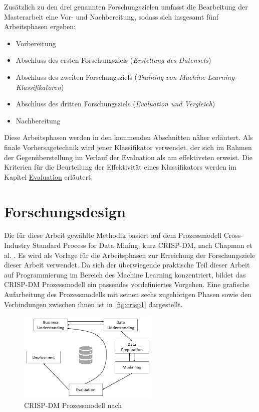 \label{phases_definition}

Zusätzlich zu den drei genannten Forschungszielen umfasst die Bearbeitung der Masterarbeit eine Vor- und Nachbereitung, sodass sich insgesamt fünf Arbeitsphasen ergeben:

\begin{itemize}
\setlength{\itemsep}{-2pt}
\item Vorbereitung
\item Abschluss des ersten Forschungsziels (\textit{Erstellung des Datensets})
\item Abschluss des zweiten Forschungsziels (\textit{Training von Machine-Learning-Klassifikatoren})
\item Abschluss des dritten Forschungsziels (\textit{Evaluation und Vergleich})
\item Nachbereitung
\end{itemize}

Diese Arbeitsphasen werden in den kommenden Abschnitten näher erläutert. Als finale Vorhersagetechnik wird jener Klassifikator verwendet, der sich im Rahmen der Gegenüberstellung im Verlauf der Evaluation als am \glqq effektivsten\grqq{} erweist. Die Kriterien für die Beurteilung der Effektivität eines Klassifikators werden im Kapitel \glqq \hyperref[evaluation]{Evaluation}\grqq{} erläutert.

\section{Forschungsdesign}

Die für diese Arbeit gewählte Methodik basiert auf dem Prozessmodell \glqq Cross-Industry Standard Process for Data Mining\grqq, kurz CRISP-DM, nach Chapman et al. \cite{Chapman2000}. Es wird als Vorlage für die Arbeitsphasen zur Erreichung der Forschungsziele dieser Arbeit verwendet. Da sich der überwiegende praktische Teil dieser Arbeit auf Programmierung im Bereich des Machine Learning konzentriert, bildet das CRISP-DM Prozessmodell ein passendes vordefiniertes Vorgehen. Eine grafische Aufarbeitung des Prozessmodells mit seinen sechs zugehörigen Phasen sowie den Verbindungen zwischen ihnen ist in \autoref{fig:crisp1} dargestellt. 

\begin{figure}[H]
    \centering
    \includegraphics[width=0.6\textwidth]{images/CRISP-DM1}
    \caption{CRISP-DM Prozessmodell nach \cite{Chapman2000}}\label{fig:crisp1}
\end{figure}

